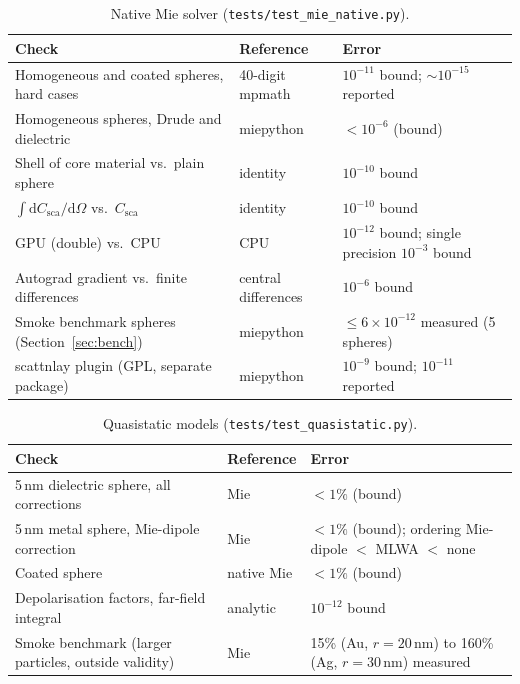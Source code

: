 \documentclass[11pt]{article}
\newcommand{\code}[1]{\texttt{#1}}
\begin{document}
\begin{table}[ht]
\centering\small
\begin{tabularx}{\linewidth}{@{}Xll@{}}
\toprule
Check & Reference & Error \\
\midrule
Homogeneous and coated spheres, hard cases & 40-digit mpmath & $10^{-11}$ bound; $\sim10^{-15}$ reported \\
Homogeneous spheres, Drude and dielectric & miepython & $<10^{-6}$ (bound) \\
Shell of core material vs.\ plain sphere & identity & $10^{-10}$ bound \\
$\int \mathrm{d}C_\mathrm{sca}/\mathrm{d}\Omega$ vs.\ $C_\mathrm{sca}$ & identity & $10^{-10}$ bound \\
GPU (double) vs.\ CPU & CPU & $10^{-12}$ bound; single precision $10^{-3}$ bound \\
Autograd gradient vs.\ finite differences & central differences & $10^{-6}$ bound \\
Smoke benchmark spheres (Section~\ref{sec:bench}) & miepython & $\le 6\times10^{-12}$ measured (5 spheres) \\
scattnlay plugin (GPL, separate package) & miepython & $10^{-9}$ bound; $10^{-11}$ reported \\
\bottomrule
\end{tabularx}
\caption{Native Mie solver (\code{tests/test\_mie\_native.py}).}
\label{tab:val-mie}
\end{table}

\begin{table}[ht]
\centering\small
\begin{tabularx}{\linewidth}{@{}Xll@{}}
\toprule
Check & Reference & Error \\
\midrule
5\,nm dielectric sphere, all corrections & Mie & $<1\%$ (bound) \\
5\,nm metal sphere, Mie-dipole correction & Mie & $<1\%$ (bound); ordering Mie-dipole $<$ MLWA $<$ none \\
Coated sphere & native Mie & $<1\%$ (bound) \\
Depolarisation factors, far-field integral & analytic & $10^{-12}$ bound \\
Smoke benchmark (larger particles, outside validity) & Mie & 15\% (Au, $r=20$\,nm) to 160\% (Ag, $r=30$\,nm) measured \\
\bottomrule
\end{tabularx}
\caption{Quasistatic models (\code{tests/test\_quasistatic.py}).}
\label{tab:val-qs}
\end{table}
\end{document}
